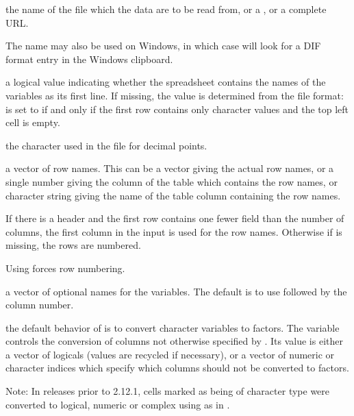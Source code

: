 \begin{Arguments}
\begin{ldescription}
\item[\code{file}] the name of the file which the data are to be read from,
or a , or a complete URL.

The name  may also be used on Windows, in which
case  will look for a DIF format entry
in the Windows clipboard.


\item[\code{header}] a logical value indicating whether the spreadsheet contains the
names of the variables as its first line.  If missing, the value is
determined from the file format:  is set to 
if and only if the first row contains only character values and
the top left cell is empty.

\item[\code{dec}] the character used in the file for decimal points.

\item[\code{row.names}] a vector of row names.  This can be a vector giving
the actual row names, or a single number giving the column of the
table which contains the row names, or character string giving the
name of the table column containing the row names.

If there is a header and the first row contains one fewer field than
the number of columns, the first column in the input is used for the
row names.  Otherwise if  is missing, the rows are
numbered.

Using  forces row numbering.


\item[\code{col.names}] a vector of optional names for the variables.
The default is to use  followed by the column number.

\item[\code{as.is}] the default behavior of  is to convert
character variables to factors.  The variable  controls the
conversion of columns not otherwise specified by .
Its value is either a vector of logicals (values are recycled if
necessary), or a vector of numeric or character indices which
specify which columns should not be converted to factors.

Note: In releases prior to \R{} 2.12.1, cells marked as being of
character type were converted to logical, numeric or complex using
 as in .


\end{ldescription}
\end{Arguments}
